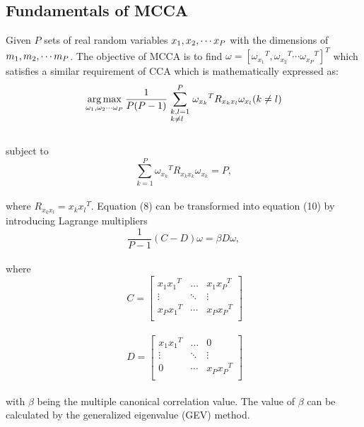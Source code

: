 \documentclass[journal]{IEEEtran}
\begin{document}
\subsection{Fundamentals of MCCA}
 Given $ P $ sets of real random variables ${x_1},{\rm{ }}{x_2}, \cdots {x_P}$ with the dimensions of ${m_1},{\rm{ }}{m_2}, \cdots {m_P}$. The objective of MCCA is to find $\omega  = {[{\omega _{x_1}}^T,{\omega _{x_2}}^T \cdots {\omega _{x_P}}^T]^T}$ which satisfies a similar requirement of CCA which is mathematically expressed as: \\
 \begin{equation} \mathop {\arg \max }\limits_{{\omega _1},{\omega _2} \cdots {\omega _P}}  \frac{1}{{P(P - 1)}}\sum\limits_{\scriptstyle k,l = 1 \hfill \atop
  \scriptstyle {\rm{ }}k \ne l \hfill}^P {{\omega _{x_k}}^T{R_{{x_k}{x_l}}}{\omega _{x_l}}} {\rm{  (}}k \ne l{\rm{)}} \end{equation}\\
  subject to \begin{equation} \sum\limits_{k = 1}^P {{\omega _{x_k}}^T{R_{{x_k}{x_k}}}{\omega _{x_k}}}  = P, \end{equation}\\
  where ${R_{{x_k}{x_l}}} = {x_k}{x_l}^T $. Equation (8) can be transformed into equation (10) by introducing Lagrange multipliers\\
  \begin{equation} \frac{1}{{P - 1}}(C - D)\omega  = \beta D\omega, \end{equation} \\ where \\
\begin{equation}\ C = \left[ {\begin{array}{*{20}{c}}
   {{x_1}{x_1}^T} &  \ldots  & {{x_1}{x_P}^T}  \\
    \vdots  &  \ddots  &  \vdots   \\
   {{x_P}{x_1}^T} &  \cdots  & {{x_P}{x_P}^T}  \\
\end{array}} \right]
 \end{equation} \\
 \begin{equation}\ D = \left[ {\begin{array}{*{20}{c}}
   {{x_1}{x_1}^T} &  \ldots  & 0  \\
    \vdots  &  \ddots  &  \vdots   \\
   0 &  \cdots  & {{x_P}{x_P}^T}  \\
\end{array}} \right]
\end{equation} \\with $ \beta $ being the multiple canonical correlation value. The value of $ \beta $ can be calculated by the generalized eigenvalue (GEV) method.
\end{document}
